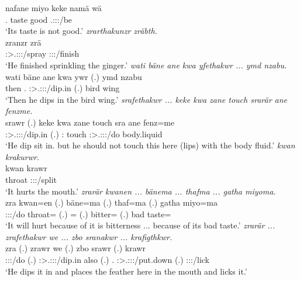 \begin{exe}
	\gll nafane miyo keke namä wä\\
	\Tsg.{\Poss} taste {\Neg} good \Tsg.\Masc:\Io:\Nonpast:\Ipfv/be\\
	\trans `Its taste is not good.'
	\emph{zrarthakunzr zräbth.}\\
	\gll zranzr zrä\\
	\Stsg:\Sbj>\Tsg.\F:\Obj:\Irr:\Ipfv/spray \Stsg:\Sbj:\Irr:\Pfv/finish\\
	\trans `He finished sprinkling the ginger.'
	\emph{wati bäne ane kwa yfethakwr ... ymd nzabu.}\\
	\gll wati bäne ane kwa ywr (.) ymd nzabu\\
	then \Recog.{\Abs} {\Dem} {\Fut} \Stsg:\Sbj>\Tsg.\Masc:\Obj:\Nonpast:\Ipfv/dip.in (.) bird wing\\
	\trans `Then he dips in the bird wing.'
	\emph{srafethakwr ... keke kwa zane touch srarär ane fenzme.}\\
	\gll srawr (.) keke kwa zane touch sra ane fenz=me\\
	\Stsg:\Sbj>\Tsg.\Masc:\Obj:\Irr:\Ipfv/dip.in (.) {\Neg} {\Fut} \Dem:{\Prox} touch \Stsg:\Sbj>\Tsg.\Masc:\Io:\Irr:\Ipfv/do {\Dem} body.liquid\\
	\trans `He dip sit in. but he should not touch this here (lips) with the body fluid.'
	\emph{kwan krakurwr.}\\
	\gll kwan krawr\\
	throat \Stsg:\Sbj:\Irr:\Ipfv/split\\
	\trans `It hurts the mouth.'
	\emph{zrarär kwanen ... bänema ... thafma ... gatha miyoma.}\\
	\gll zra kwan=en (.) bäne=ma (.) thaf=ma (.) gatha miyo=ma\\
	\Stsg:\Sbj:\Irr:\Ipfv/do throat={\Loc} (.) \Recog={\Char} (.) bitter={\Char} (.) bad taste=\Char\\
	\trans `It will hurt because of it is bitterness ... because of its bad taste.'
	\emph{zrarär ... zrafethakwr we ... zbo sranakwr ... krafigthkwr.}\\
	\gll zra (.) zrawr we (.) zbo srawr (.) krawr\\
	\Stsg:\Sbj:\Irr:\Ipfv/do (.) \Stsg:\Sbj>\Tsg.\F:\Obj:\Irr:\Ipfv/dip.in also (.) \Prox.{\All} \Stsg:\Sbj>\Tsg.\Masc:\Io:\Irr:\Ipfv/put.down (.) \Stsg:\Sbj:\Irr:\Ipfv/lick\\
	\trans `He dips it in and places the feather here in the mouth and licks it.'

\end{exe}
